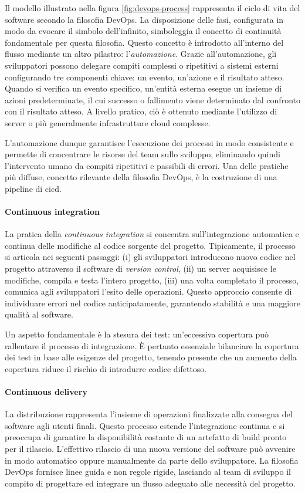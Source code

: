 Il modello illustrato nella figura \ref{fig:devops-process} rappresenta il ciclo di vita del software secondo la filosofia DevOps. La disposizione delle fasi, configurata in modo da evocare il simbolo dell'infinito, simboleggia il concetto di continuità fondamentale per questa filosofia. Questo concetto è introdotto all'interno del flusso mediante un altro pilastro: l'\textit{automazione}. Grazie all'automazione, gli sviluppatori possono delegare compiti complessi o ripetitivi a sistemi esterni configurando tre componenti chiave: un evento, un'azione e il risultato atteso. Quando si verifica un evento specifico, un'entità esterna esegue un insieme di azioni predeterminate, il cui successo o fallimento viene determinato dal confronto con il risultato atteso. A livello pratico, ciò è ottenuto mediante l'utilizzo di server o più generalmente infrastrutture cloud complesse.

L'automazione dunque garantisce l'esecuzione dei processi in modo consistente e permette di concentrare le risorse del team sullo sviluppo, eliminando quindi l'intervento umano da compiti ripetitivi e passibili di errori. Una delle pratiche più diffuse, concetto rilevante della filosofia DevOps, è la costruzione di una pipeline di \ac{cicd}.

\paragraph{Continuous integration} La pratica della \textit{continuous integration} si concentra sull'integrazione automatica e continua delle modifiche al codice sorgente del progetto. Tipicamente, il processo si articola nei seguenti passaggi: (i) gli sviluppatori introducono nuovo codice nel progetto attraverso il software di \textit{version control}, (ii) un server acquisisce le modifiche, compila e testa l'intero progetto, (iii) una volta completato il processo, comunica agli sviluppatori l'esito delle operazioni. Questo approccio consente di individuare errori nel codice anticipatamente, garantendo stabilità e una maggiore qualità al software.

Un aspetto fondamentale è la stesura dei test: un'eccessiva copertura può rallentare il processo di integrazione. È pertanto essenziale bilanciare la copertura dei test in base alle esigenze del progetto, tenendo presente che un aumento della copertura riduce il rischio di introdurre codice difettoso.

\paragraph{Continuous delivery} La distribuzione rappresenta l'insieme di operazioni finalizzate alla consegna del software agli utenti finali. Questo processo estende l'integrazione continua e si preoccupa di garantire la disponibilità costante di un artefatto di build pronto per il rilascio. L'effettivo rilascio di una nuova versione del software può avvenire in modo automatico oppure manualmente da parte dello sviluppatore. La filosofia DevOps fornisce linee guida e non regole rigide, lasciando al team di sviluppo il compito di progettare ed integrare un flusso adeguato alle necessità del progetto.


